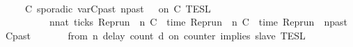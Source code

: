 \begin{isabellebody}
\ \ \ \ \ \ \ \ \ \ \ \ \ \ \ \ \ {\isacharparenright}\isanewline
\ \ \ \ \ \ \ \ {\isacharbraceright}{\isacartoucheclose}\isanewline
\ \ %
\isanewline
\ \ %
\isanewline
\ \ {\isacharbar}\ {\isacartoucheopen}{\isasymlbrakk}\ C\ sporadic{\isasymsharp}\ {\isasymlparr}{\isasymtau}\isactrlsub v\isactrlsub a\isactrlsub r{\isacharparenleft}C\isactrlsub p\isactrlsub a\isactrlsub s\isactrlsub t{\isacharcomma}\ n\isactrlsub p\isactrlsub a\isactrlsub s\isactrlsub t{\isacharparenright}\ {\isasymoplus}\ {\isasymdelta}{\isasymtau}{\isasymrparr}\ on\ C\ {\isasymrbrakk}\isactrlsub T\isactrlsub E\isactrlsub S\isactrlsub L\ {\isacharequal}\isanewline
\ \ \ \ \ \ \ \ {\isacharbraceleft}{\isasymrho}{\isachardot}\ {\isasymexists}n{\isacharcolon}{\isacharcolon}nat{\isachardot}\ ticks\ {\isacharparenleft}{\isacharparenleft}Rep{\isacharunderscore}run\ {\isasymrho}{\isacharparenright}\ n\ C\ {\isasymand}\ time\ {\isacharparenleft}{\isacharparenleft}Rep{\isacharunderscore}run\ {\isasymrho}{\isacharparenright}\ n\ C\ {\isacharequal}\ time\ {\isacharparenleft}{\isacharparenleft}Rep{\isacharunderscore}run\ {\isasymrho}{\isacharparenright}\ n\isactrlsub p\isactrlsub a\isactrlsub s\isactrlsub t\ C\isactrlsub p\isactrlsub a\isactrlsub s\isactrlsub t{\isacharparenright}\ {\isacharplus}\ {\isasymdelta}{\isasymtau}\ {\isacharbraceright}{\isacartoucheclose}\isanewline
\ \ {\isacharbar}\ {\isacartoucheopen}{\isasymlbrakk}\ from\ n\ delay\ count\ d\ on\ counter\ implies\ slave\ {\isasymrbrakk}\isactrlsub T\isactrlsub E\isactrlsub S\isactrlsub L\ {\isacharequal}\isanewline

\end{isabellebody}
